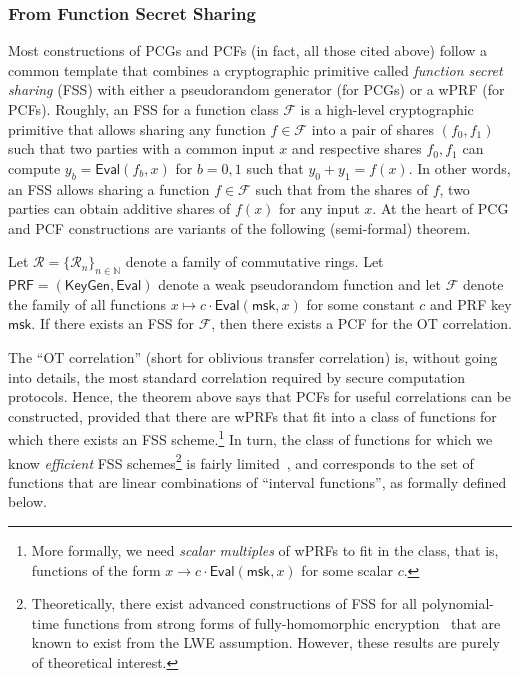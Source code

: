 \documentclass[journal=tosc,submission]{iacrtrans}
\theoremstyle{theorem}
\newcommand\setF{\ensuremath{\mathcal{F}}\xspace}
\newcommand\ring{\ensuremath{\mathcal{R}}\xspace}
\newcommand\PRF{\ensuremath{\mathsf{PRF}}\xspace}
\newcommand\msk{\ensuremath{\mathsf{msk}}\xspace}
\newcommand\KeyGen{\ensuremath{\mathsf{KeyGen}}\xspace}
\newcommand\Eval{\ensuremath{\mathsf{Eval}}\xspace}
\newcommand\N{\mathbb{N}}
\begin{document}
\subsubsection{From Function Secret Sharing}
\label{subsubsec:fss}

Most constructions of PCGs and PCFs (in fact, all those cited above) follow a common template that combines a cryptographic primitive called \emph{function secret sharing} (FSS) with either a pseudorandom generator (for PCGs) or a wPRF (for PCFs). Roughly, an FSS for a function class $\setF$ is a high-level cryptographic primitive that allows sharing any function $f\in \setF$ into a pair of shares $(f_0, f_1)$ such that two parties with a common input $x$ and respective shares $f_0,f_1$ can compute $y_b = \Eval(f_b,x)$ for $b=0,1$ such that $y_0+y_1 = f(x)$. In other words, an FSS allows sharing a function $f\in\setF$ such that from the shares of $f$, two parties can obtain additive shares of $f(x)$ for any input $x$. At the heart of PCG and PCF constructions are variants of the following (semi-formal) theorem.
\begin{theorem}
\label{thm:pcf-ot}
Let $\ring = \{\ring_n\}_{n\in \N}$ denote a family of commutative rings. Let $\PRF=(\KeyGen,\Eval)$ denote a weak pseudorandom function and let $\setF$ denote the family of all functions $x\mapsto c\cdot\Eval(\msk,x)$ for some constant $c$ and PRF key $\msk$. If there exists an FSS for $\setF$, then there exists a PCF for the OT correlation.
\end{theorem}


The ``OT correlation'' (short for oblivious transfer correlation) is, without going into details, the most standard correlation required by secure computation protocols. Hence, the theorem above says that PCFs for useful correlations can be constructed, provided that there are wPRFs that fit into a class of functions for which there exists an FSS scheme.\footnote{More formally, we need \emph{scalar multiples} of wPRFs to fit in the class, that is, functions of the form $x\to c\cdot \Eval(\msk,x)$ for some scalar $c$.} In turn, the class of functions for which we know \emph{efficient} FSS schemes\footnote{Theoretically, there exist advanced constructions of FSS for all polynomial-time functions from strong forms of fully-homomorphic encryption~\cite{C:DHRW16} that are known to exist from the LWE assumption. However, these results are purely of theoretical interest.} is fairly limited~\cite{CCS:BoyGilIsh16}, and corresponds to the set of functions that are linear combinations of ``interval functions'', as formally defined below.
\end{document}
